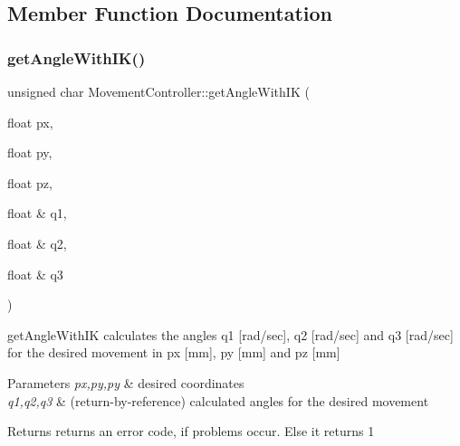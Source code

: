 \subsection{Member Function Documentation}
\mbox{\label{class_movement_controller_a53d19d2516a2ed440c2b15fc47ea91b7}} 
\subsubsection{\texorpdfstring{get\+Angle\+With\+I\+K()}{getAngleWithIK()}}
{\footnotesize\ttfamily unsigned char Movement\+Controller\+::get\+Angle\+With\+IK (\begin{DoxyParamCaption}\item[{float}]{px,  }\item[{float}]{py,  }\item[{float}]{pz,  }\item[{float \&}]{q1,  }\item[{float \&}]{q2,  }\item[{float \&}]{q3 }\end{DoxyParamCaption})}

get\+Angle\+With\+IK  calculates the angles q1 \mbox{[}rad/sec\mbox{]}, q2 \mbox{[}rad/sec\mbox{]} and q3 \mbox{[}rad/sec\mbox{]} for the desired movement in px \mbox{[}mm\mbox{]}, py \mbox{[}mm\mbox{]} and pz \mbox{[}mm\mbox{]} 
\begin{DoxyParams}{Parameters}
{\em px,py,py} & desired coordinates \\
\hline
{\em q1,q2,q3} & (return-\/by-\/reference) calculated angles for the desired movement \\
\hline
\end{DoxyParams}
\begin{DoxyReturn}{Returns}
returns an error code, if problems occur. Else it returns 1 
\end{DoxyReturn}
\mbox{\label{class_movement_controller_a5765726eb4e820a7ac669c88fe4937e7}} 
